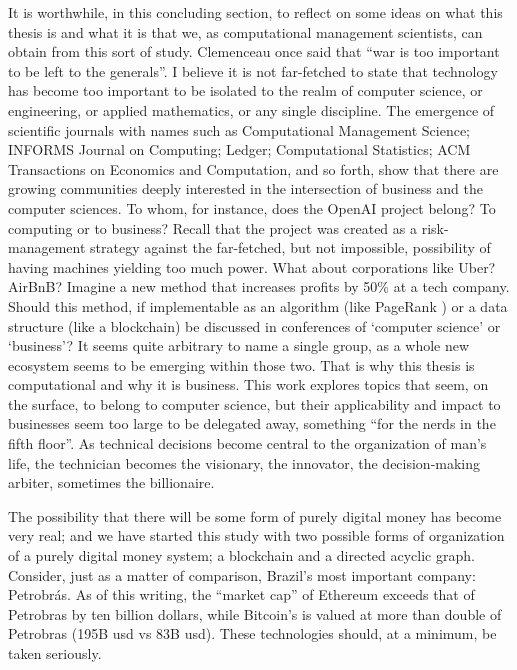 It is worthwhile, in this concluding section, to reflect on some ideas on what this thesis is and what it is that we, as computational management scientists, can obtain from this sort of study.  Clemenceau once said that ``war is too important to be left to the generals''.  I believe it is not far-fetched to state that technology has become too important to be isolated to the realm of computer science, or engineering, or applied mathematics, or any single discipline.  The emergence of scientific journals with names such as Computational Management Science; INFORMS Journal on Computing; Ledger; Computational Statistics; ACM Transactions on Economics and Computation, and so forth, show that there are growing communities deeply interested in the intersection of business and the computer sciences.  To whom, for instance, does the OpenAI project belong?  To computing or to business?  Recall that the project was created as a risk-management strategy against the far-fetched, but not impossible, possibility of having machines yielding too much power.  What about corporations like Uber?  AirBnB?  Imagine a new method that increases profits by 50\% at a tech company.  Should this method, if implementable as an algorithm (like PageRank \citet{brin1998anatomy}) or a data structure (like a blockchain) be discussed in conferences of `computer science' or `business'? It seems quite arbitrary to name a single group, as a whole new ecosystem seems to be emerging within those two. That is why this thesis is computational and why it is business.  This work explores topics that seem, on the surface, to belong to computer science, but their applicability and impact to businesses seem too large to be delegated away, something ``for the nerds in the fifth floor''.  As technical decisions become central to the organization of man's life, the technician becomes the visionary, the innovator, the decision-making arbiter, sometimes the billionaire.

The possibility that there will be some form of purely digital money has become very real; and we have started this study with two possible forms of organization of a purely digital money system; a blockchain and a directed acyclic graph.  Consider, just as a matter of comparison, Brazil's most important company: Petrobrás.  As of this writing, the ``market cap'' of Ethereum exceeds that of Petrobras by ten billion dollars, while Bitcoin's is valued at more than double of Petrobras (195B usd vs 83B usd).  These technologies should, at a minimum, be taken seriously.



